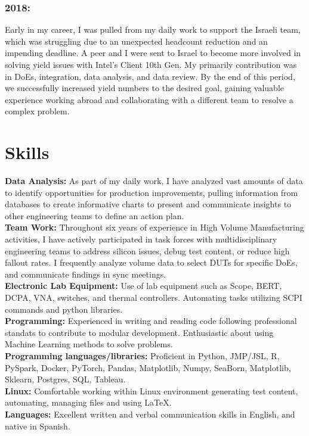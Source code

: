 \documentclass{article}
\begin{document}
\subsubsection{2018:}
Early in my career, I was pulled from my daily work to support the Israeli team, which was struggling due to an unexpected headcount reduction and an impending deadline. A peer and I were sent to Israel to become more involved in solving yield issues with Intel's Client 10th Gen. My primarily contribution was in DoEs, integration, data analysis, and data review. By the end of this period, we successfully increased yield numbers to the desired goal, gaining valuable experience working abroad and collaborating with a different team to resolve a complex problem.

\section{Skills}
\noindent\textbf{Data Analysis:} As part of my daily work, I have analyzed vast amounts of data to identify opportunities for production improvements, pulling information from databases to create informative charts to present and communicate insights to other engineering teams to define an action plan.\\
\textbf{Team Work:} Throughout six years of experience in High Volume Manufacturing activities, I have actively participated in task forces with multidisciplinary engineering teams to address silicon issues, debug test content, or reduce high fallout rates. I frequently analyze volume data to select DUTs for specific DoEs, and communicate findings in sync meetings.\\
\textbf{Electronic Lab Equipment:} Use of lab equipment such as Scope, BERT, DCPA, VNA, switches, and thermal controllers. Automating tasks utilizing SCPI commands and python libraries.\\
\textbf{Programming:} Experienced in writing and reading code following professional standats to contribute to modular development. Enthusiastic about using Machine Learning methods to solve problems.\\
\textbf{Programming languages/libraries:} Proficient in Python, JMP/JSL, R, PySpark, Docker, PyTorch, Pandas, Matplotlib, Numpy, SeaBorn, Matplotlib, Sklearn, Postgres, SQL, Tableau.\\
\textbf{Linux:} Comfortable working within Linux environment generating test content, automating, managing files and using \LaTeX .\\
\textbf{Languages:} Excellent written and verbal communication skills in English, and native in Spanish.
\end{document}
